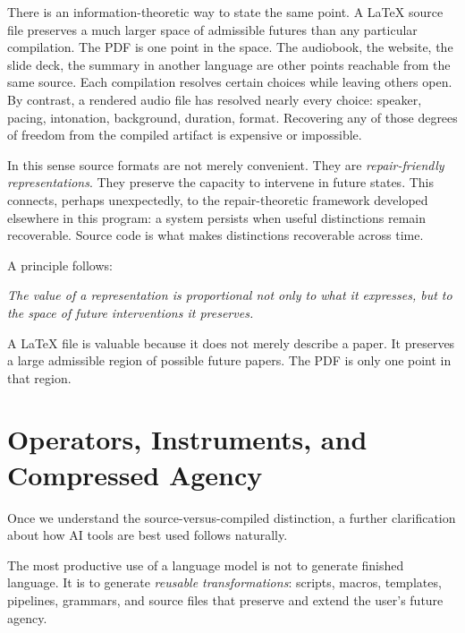 \documentclass[12pt]{article}
\begin{document}
There is an information-theoretic way to state the same point. A \LaTeX{} source file preserves a much larger space of admissible futures than any particular compilation. The PDF is one point in the space. The audiobook, the website, the slide deck, the summary in another language are other points reachable from the same source. Each compilation resolves certain choices while leaving others open. By contrast, a rendered audio file has resolved nearly every choice: speaker, pacing, intonation, background, duration, format. Recovering any of those degrees of freedom from the compiled artifact is expensive or impossible.

In this sense source formats are not merely convenient. They are \emph{repair-friendly representations}. They preserve the capacity to intervene in future states. This connects, perhaps unexpectedly, to the repair-theoretic framework developed elsewhere in this program: a system persists when useful distinctions remain recoverable. Source code is what makes distinctions recoverable across time.

\medskip

\noindent A principle follows:

\begin{mdframed}[backgroundcolor=quoteblock,linewidth=0pt,innerleftmargin=12pt,innerrightmargin=12pt,innertopmargin=8pt,innerbottommargin=8pt]
\textit{The value of a representation is proportional not only to what it expresses, but to the space of future interventions it preserves.}
\end{mdframed}

\medskip

A \LaTeX{} file is valuable because it does not merely describe a paper. It preserves a large admissible region of possible future papers. The PDF is only one point in that region.

\section{Operators, Instruments, and Compressed Agency}

Once we understand the source-versus-compiled distinction, a further clarification about how AI tools are best used follows naturally.

The most productive use of a language model is not to generate finished language. It is to generate \emph{reusable transformations}: scripts, macros, templates, pipelines, grammars, and source files that preserve and extend the user's future agency.
\end{document}
